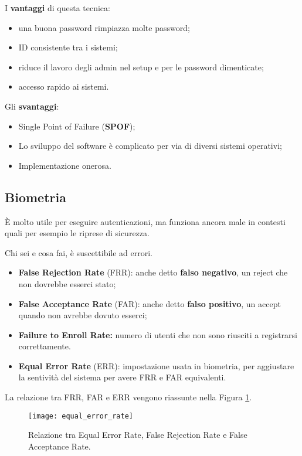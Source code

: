 I \textbf{vantaggi} di questa tecnica:
\begin{itemize}
\item una buona password rimpiazza molte password;
\item ID consistente tra i sistemi;
\item riduce il lavoro degli admin nel setup e per le password dimenticate;
\item accesso rapido ai sistemi.
\end{itemize}



Gli \textbf{svantaggi}:
\begin{itemize}
\item Single Point of Failure (\textbf{SPOF});
\item Lo sviluppo del software è complicato per via di diversi sistemi
operativi;
\item Implementazione onerosa.
\end{itemize}

\subsection{Biometria}

È molto utile per eseguire autenticazioni, ma funziona ancora male in contesti
quali per esempio le riprese di sicurezza.

Chi sei e cosa fai, è suscettibile ad errori.

\begin{itemize}
\item \textbf{False Rejection Rate} (FRR): anche detto
\textbf{falso negativo}, un reject che non dovrebbe esserci stato;
\item \textbf{False Acceptance Rate} (FAR): anche detto
\textbf{falso positivo}, un accept quando non avrebbe dovuto esserci;
\item \textbf{Failure to Enroll Rate:} numero di utenti che non sono
riusciti a registrarsi correttamente.
\item \textbf{Equal Error Rate} (ERR): impostazione usata
in biometria, per aggiustare la sentività del sistema per avere
FRR e FAR equivalenti.
\end{itemize}
La relazione tra FRR, FAR e ERR vengono riassunte nella Figura
\ref{fig:equalErrorRate}.

\begin{figure}[H]
 \centering
 \texttt{[image: equal\_error\_rate]}
 \caption{Relazione tra Equal Error Rate, False Rejection Rate e
 False Acceptance Rate.}
 \label{fig:equalErrorRate}
\end{figure}


